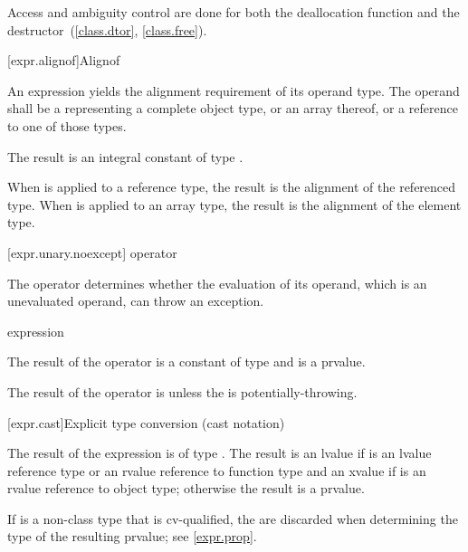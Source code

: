 \pnum
Access and ambiguity control are done for both the deallocation function
and the destructor~(\ref{class.dtor}, \ref{class.free}).

[expr.alignof]{Alignof}

\pnum
{}%
%
An  expression yields the alignment requirement
of its operand type. The operand shall be a 
representing a complete object type, or an array thereof, or a reference
to one of those types.

\pnum
The result is an integral constant of type
.

\pnum
When  is applied to a reference type, the result
is the alignment of the referenced type. When 
is applied to an array type, the result is the alignment of the
element type.

[expr.unary.noexcept]{ operator}

\pnum
{}%
%
The  operator determines whether the evaluation of its operand,
which is an unevaluated operand, can throw an
exception.

\begin{bnf}
\br
   \terminal{(} expression \terminal{)}
\end{bnf}

\pnum
The result of the  operator is a constant of type 
and is a prvalue.

\pnum
The result of the  operator is 
unless the  is potentially-throwing.

[expr.cast]{Explicit type conversion (cast notation)}%

\pnum
The result of the expression   is
of type . The result is an lvalue if  is an lvalue
reference type or an rvalue reference to function type and an xvalue if 
is an rvalue reference to object type; otherwise the result is a prvalue.
\begin{note}
If  is a non-class type that is cv-qualified, the
 are discarded when determining the type of the
resulting prvalue; see \ref{expr.prop}.
\end{note}


